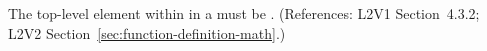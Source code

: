 The top-level element within  in a \FunctionDefinition must be
.  (References: L2V1 Section~4.3.2; L2V2
Section~\ref{sec:function-definition-math}.)

